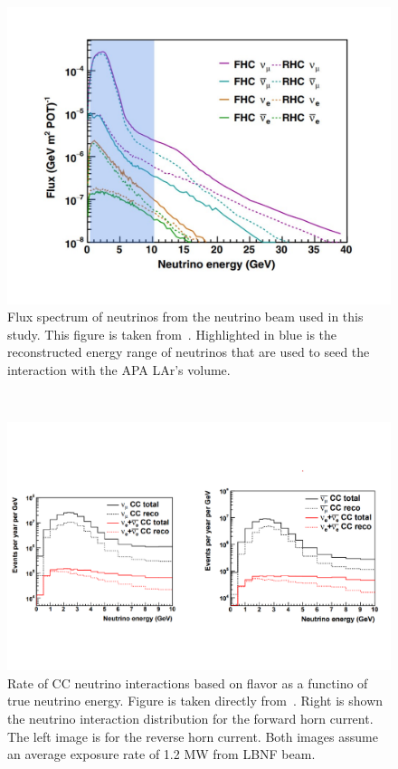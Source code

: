 \begin{figure}[]
\centering
\includegraphics[width=\textwidth]{images/dune_flux_energy_range.pdf}
\caption{Flux spectrum of neutrinos from the neutrino beam used in this study. This figure is taken from~\cite{electron_flux_image_2020}. 
Highlighted in blue is the reconstructed energy range of neutrinos that are used to seed the interaction with the APA LAr's volume.}
\end{figure}~\label{fig:neutrino_flux}

\begin{figure}[]
\centering
\includegraphics[width=\textwidth]{images/dune_cdr_2021_neutrino_flux.pdf}
\caption{Rate of CC neutrino interactions based on flavor as a functino of true neutrino energy.
Figure is taken directly from~\citep{dune_2021_near_detector_cdr}.
Right is shown the neutrino interaction distribution for the forward horn current.
The left image is for the reverse horn current.
Both images assume an average exposure rate of 1.2 MW from LBNF beam.}
\end{figure}~\label{fig:neutrino_interaction_flux}


